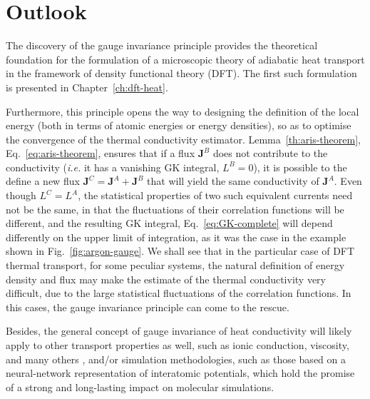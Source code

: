 \section{Outlook}  \label{sec:gauge-outlook}
The discovery of the gauge invariance principle provides the theoretical foundation for the formulation of a microscopic theory of adiabatic heat transport in the framework of density functional theory (DFT). The first such formulation is presented in Chapter~\ref{ch:dft-heat}. 

Furthermore, this principle opens the way to designing the definition of the local energy (both in terms of atomic energies or energy densities), so as to optimise the convergence of the thermal conductivity estimator.
Lemma~\ref{th:aris-theorem}, Eq.~\eqref{eq:aris-theorem}, ensures that if a flux $\mathbf{J}^B$ does not contribute to the conductivity (\emph{i.e.} it has a vanishing GK integral, $L^B=0$), it is possible to the define a new flux $\mathbf{J}^C=\mathbf{J}^A+\mathbf{J}^B$ that will yield the same conductivity of $\mathbf{J}^A$. Even though $L^C=L^A$, the statistical properties of two such equivalent currents need not be the same, in that the fluctuations of their correlation functions will be different, and the resulting GK integral, Eq.~\eqref{eq:GK-complete} will depend differently on the upper limit of integration, as it was the case in the example shown in Fig.~\ref{fig:argon-gauge}.
We shall see that in the particular case of DFT thermal transport, for some peculiar systems, the natural definition of energy density and flux may make the estimate of the thermal conductivity very difficult, due to the large statistical fluctuations of the correlation functions. In this cases, the gauge invariance principle can come to the rescue.

Besides, the general concept of gauge invariance of heat conductivity will likely apply to other transport properties as well, such as ionic conduction, viscosity, and many others \cite{Chetty1992}, and/or simulation methodologies, such as those based on a neural-network representation of interatomic potentials, which hold the promise of a strong and long-lasting impact on molecular simulations. 

